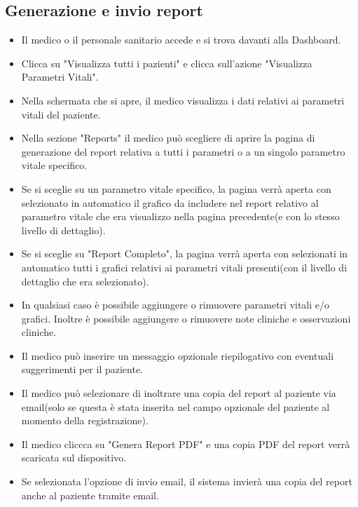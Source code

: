 \documentclass[12pt,a4paper,oneside]{report}
\begin{document}
\subsection{Generazione e invio report}
\begin{itemize}
    \item Il medico o il personale sanitario accede e si trova davanti alla Dashboard.
    \item Clicca su "Visualizza tutti i pazienti" e clicca sull'azione "Visualizza Parametri Vitali".
    \item Nella schermata che si apre, il medico visualizza i dati relativi ai parametri vitali del paziente.
    \item Nella sezione "Reports" il medico può scegliere di aprire la pagina di generazione del report relativa a tutti i parametri o a un singolo parametro vitale specifico.
    \item Se si sceglie su un parametro vitale specifico, la pagina verrà aperta con selezionato in automatico il grafico da includere nel report relativo al parametro vitale che era visualizzo nella pagina precedente(e con lo stesso livello di dettaglio).
    \item Se si sceglie su "Report Completo", la pagina verrà aperta con selezionati in automatico tutti i grafici relativi ai parametri vitali presenti(con il livello di dettaglio che era selezionato).
    \item In qualsiasi caso è possibile aggiungere o rimuovere parametri vitali e/o grafici. Inoltre è possibile aggiungere o rimuovere note cliniche e osservazioni cliniche.
    \item Il medico può inserire un messaggio opzionale riepilogativo con eventuali suggerimenti per il paziente.
    \item Il medico può selezionare di inoltrare una copia del report al paziente via email(solo se questa è stata inserita nel campo opzionale del paziente al momento della registrazione).
    \item Il medico cliccca su "Genera Report PDF" e una copia PDF del report verrà scaricata sul dispositivo.
    \item Se selezionata l'opzione di invio email, il sistema invierà una copia del report anche al paziente tramite email.
\end{itemize}
\end{document}
